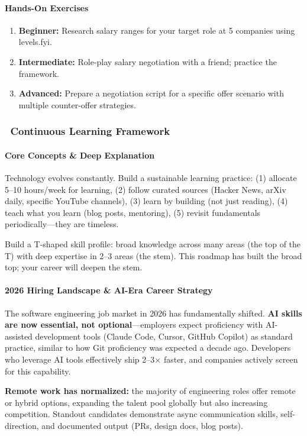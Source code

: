 \documentclass[11pt, a4paper, oneside]{report}
\newcommand{\mustmaster}[1]{\subsubsection{\texorpdfstring{\fcolorbox{blue!40!black}{blue!8}{\footnotesize\bfseries\color{blue!40!black} MUST MASTER}~#1}{#1}}}
\begin{document}
\paragraph{Hands-On Exercises}
\begin{enumerate}[leftmargin=*]
\item \textbf{Beginner:} Research salary ranges for your target role at 5 companies using levels.fyi.
\item \textbf{Intermediate:} Role-play salary negotiation with a friend; practice the framework.
\item \textbf{Advanced:} Prepare a negotiation script for a specific offer scenario with multiple counter-offer strategies.
\end{enumerate}

\mustmaster{Continuous Learning Framework}

\paragraph{Core Concepts \& Deep Explanation} Technology evolves constantly. Build a sustainable learning practice: (1) allocate 5--10 hours/week for learning, (2) follow curated sources (Hacker News, arXiv daily, specific YouTube channels), (3) learn by building (not just reading), (4) teach what you learn (blog posts, mentoring), (5) revisit fundamentals periodically---they are timeless.

Build a T-shaped skill profile: broad knowledge across many areas (the top of the T) with deep expertise in 2--3 areas (the stem). This roadmap has built the broad top; your career will deepen the stem.

\paragraph{2026 Hiring Landscape \& AI-Era Career Strategy}
The software engineering job market in 2026 has fundamentally shifted. \textbf{AI skills are now essential, not optional}---employers expect proficiency with AI-assisted development tools (Claude Code, Cursor, GitHub Copilot) as standard practice, similar to how Git proficiency was expected a decade ago. Developers who leverage AI tools effectively ship 2--3$\times$ faster, and companies actively screen for this capability.

\textbf{Remote work has normalized:} the majority of engineering roles offer remote or hybrid options, expanding the talent pool globally but also increasing competition. Standout candidates demonstrate async communication skills, self-direction, and documented output (PRs, design docs, blog posts).
\end{document}
